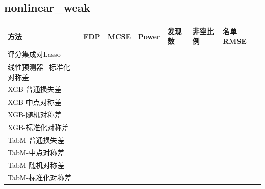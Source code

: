 \documentclass[UTF8,11pt,a4paper]{ctexart}
\begin{document}
\subsection{nonlinear\_weak}\label{nonlinear_weak}

{\def\LTcaptype{none} %
{
\footnotesize
\begin{longtable}[]{@{}
  >{\raggedright\arraybackslash}p{}
  >{\raggedright\arraybackslash}p{}
  >{\raggedright\arraybackslash}p{}
  >{\raggedright\arraybackslash}p{}
  >{\raggedright\arraybackslash}p{}
  >{\raggedright\arraybackslash}p{}
  >{\raggedright\arraybackslash}p{}@{}}
\toprule\noalign{}
\begin{minipage}[b]{\linewidth}\raggedright
方法
\end{minipage} & \begin{minipage}[b]{\linewidth}\raggedright
FDP
\end{minipage} & \begin{minipage}[b]{\linewidth}\raggedright
MCSE
\end{minipage} & \begin{minipage}[b]{\linewidth}\raggedright
Power
\end{minipage} & \begin{minipage}[b]{\linewidth}\raggedright
发现数
\end{minipage} & \begin{minipage}[b]{\linewidth}\raggedright
非空比例
\end{minipage} & \begin{minipage}[b]{\linewidth}\raggedright
名单RMSE
\end{minipage} \\
\midrule\noalign{}
\endhead
\bottomrule\noalign{}
\endlastfoot
评分集成对Lasso & 0.0512 & 0.0171 & 0.0390 & 0.83 & 0.10 & 1.7252 \\
线性预测器+标准化对称差 & 0.0742 & 0.0177 & 0.0750 & 1.39 & 0.17 & 1.7212 \\
XGB-普通损失差 & 0.1784 & 0.0164 & 0.9160 & 11.81 & 1.00 & 1.5172 \\
XGB-中点对称差 & 0.1817 & 0.0156 & 0.9030 & 11.61 & 1.00 & 1.5204 \\
XGB-随机对称差 & 0.1733 & 0.0164 & 0.9020 & 11.63 & 0.99 & 1.5217 \\
XGB-标准化对称差 & 0.1926 & 0.0185 & 0.5540 & 8.04 & 0.77 & 1.5930 \\
TabM-普通损失差 & 0.1944 & 0.0185 & 0.7490 & 10.30 & 0.94 & 1.5428 \\
TabM-中点对称差 & 0.1823 & 0.0187 & 0.7580 & 10.34 & 0.94 & 1.5397 \\
TabM-随机对称差 & 0.1826 & 0.0174 & 0.7610 & 10.23 & 0.93 & 1.5411 \\
TabM-标准化对称差 & 0.1636 & 0.0189 & 0.4310 & 6.44 & 0.63 & 1.6157 \\
\end{longtable}
}
}
\end{document}
